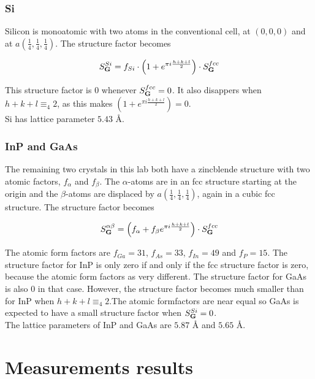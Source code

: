 \documentclass[a4paper,twoside=false,abstract=false,numbers=noenddot,
titlepage=false,headings=small,parskip=half,version=last]{scrartcl}
\begin{document}
\subsubsection{Si}
Silicon is monoatomic with two atoms in the conventional cell, at $(0,0,0)$ and at $a(\frac{1}{4},\frac{1}{4},\frac{1}{4})$.
The structure factor becomes

\begin{equation}
    \label{eq:sistructure}
    S^{Si}_{\bold{G}}
    = f_{Si}\cdot \left( 1 + e^{\pi i \frac{h+k+l}{2}} \right) \cdot S^{fcc}_{\bold{G}}\nonumber
\end{equation}

This structure factor is $0$ whenever $S^{fcc}_{\bold{G}}=0$. It also disappers when $h+k+l\equiv_4 2$, as this makes $\left( 1 + e^{\pi i \frac{h+k+l}{2}} \right)=0$.\\
Si has lattice parameter $5.43$ Å.

\subsubsection{InP and GaAs}
The remaining two crystals in this lab both have a zincblende structure with two atomic factors, $f_\alpha$ and $f_\beta$.
The $\alpha$-atoms are in an fcc structure starting at the origin and the $\beta$-atoms are displaced by $a(\frac{1}{4},\frac{1}{4},\frac{1}{4})$, again in a cubic fcc structure.
The structure factor becomes

\begin{equation}
    \label{eq:zincblendestructure}
    S^{\alpha\beta}_{\bold{G}}
    = \left( f_\alpha + f_\beta e^{\pi i \frac{h+k+l}{2}} \right) \cdot S^{fcc}_{\bold{G}}\nonumber
\end{equation}

The atomic form factors are $f_{Ga}=31$, $f_{As}=33$, $f_{In}=49$ and $f_{P}=15$.
The structure factor for InP is only zero if and only if the fcc structure factor is zero, because the atomic form factors as very different.
The structure factor for GaAs is also 0 in that case. However, the structure factor becomes much smaller than for InP when $h+k+l\equiv_4 2$.The atomic formfactors are near equal so GaAs is expected to have a small structure factor when $S_\bold{G}^{Si}=0$.\\
The lattice parameters of InP and GaAs are $5.87$ Å and $5.65$ Å.

\section{Measurements results}
\end{document}

